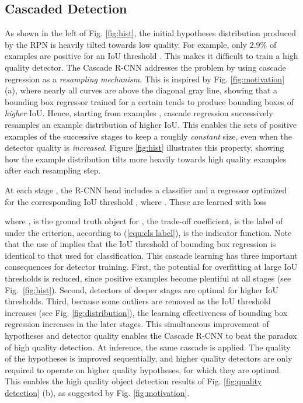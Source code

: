 \documentclass[10pt,journal,compsoc]{IEEEtran}
\begin{document}
\subsection{Cascaded Detection}
\label{subsec:cascade}

As shown in the left of Fig. \ref{fig:hist}, the initial hypotheses
distribution produced by the RPN is heavily tilted towards low quality.
For example, only 2.9\% of examples are positive for an IoU threshold
. This makes it difficult to train a high quality detector.
The Cascade R-CNN addresses the problem by using cascade regression as
a {\it resampling mechanism\/}. This is inspired by
Fig. \ref{fig:motivation} (a), where nearly all curves are
above the diagonal gray line, showing that a bounding box regressor trained
for a certain  tends to produce bounding boxes of {\it higher\/} IoU.
Hence, starting from examples , cascade
regression
successively resamples an example distribution 
of higher IoU. This enables the sets of positive
examples of the successive stages to keep a roughly {\it constant\/} size,
even when the detector quality  is {\it increased\/}.
Figure \ref{fig:hist} illustrates this property, showing how the
example distribution tilts more heavily towards high quality examples after
each resampling step.

At each stage , the R-CNN head includes a classifier  and a
regressor  optimized for the corresponding IoU threshold ,
where . These are learned with loss

where ,  is the
ground truth object for ,  the trade-off coefficient,
 is the label of  under the  criterion, according to
(\ref{equ:cls label}),  is the indicator function. Note that
the use of  implies that the IoU threshold  of bounding box
regression is identical to that used for classification. This cascade learning has
three important consequences for detector training. First, the
potential for overfitting at large IoU thresholds  is reduced, since
positive examples become plentiful at all stages (see Fig.~\ref{fig:hist}).
Second, detectors of deeper stages are optimal for higher IoU
thresholds. Third, because some outliers are removed as the IoU threshold
increases (see Fig. \ref{fig:distribution}), the learning effectiveness of bounding
box regression increases in the later stages. This simultaneous improvement
of hypotheses and detector quality enables the Cascade R-CNN to beat
the paradox of high quality detection. At inference, the same cascade is applied.
The quality of the hypotheses is improved sequentially, and higher quality
detectors are only required to operate on higher quality hypotheses,
for which they are optimal. This enables the high quality object detection
results of Fig. \ref{fig:quality detection} (b), as suggested by Fig. \ref{fig:motivation}.
\end{document}
